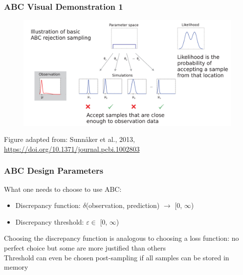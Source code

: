 \documentclass{beamer}
\begin{document}
\begin{frame}
\frametitle{ABC Visual Demonstration 1}
\vspace{-1em}
\begin{figure}[ht]
\centerline{\includegraphics[width=\columnwidth]{img/abc1.png}}
\end{figure}
\vspace{-1em}
\tiny{Figure adapted from: Sunn{\aa}ker et al., 2013, \url{https://doi.org/10.1371/journal.pcbi.1002803}}
\end{frame}

\begin{frame}
\frametitle{ABC Design Parameters}
What one needs to choose to use ABC:
\begin{itemize}
\item Discrepancy function: $\delta$(observation, prediction) $\rightarrow$ [0, $\infty$)
\item Discrepancy threshold: $\varepsilon \in$ [0, $\infty$)
\end{itemize}
\medskip
Choosing the discrepancy function is analogous to choosing a loss function: no perfect choice but some are more justified than others\\
\medskip
Threshold can even be chosen post-sampling if all samples can be stored in memory
\end{frame}

\newcommand{\filmslide}[1]{
\begin{frame}
 \frametitle{ABC Visual Demonstration 2}
 \begin{figure}[ht]
 \begin{center}
 \texttt{[image: ./film/\#1.png]}
 \end{center}
 \end{figure}
 \bigskip
 \tiny{From (slides): Kangasr\"a\"asi\"o et al., 2017, \url{http://dl.acm.org/citation.cfm?id=3025576}}\\
 \tiny{Algorithm: Gutmann \& Corander, 2016, \url{http://jmlr.org/papers/v17/15-017.html}}
\end{frame}
}
\end{document}
